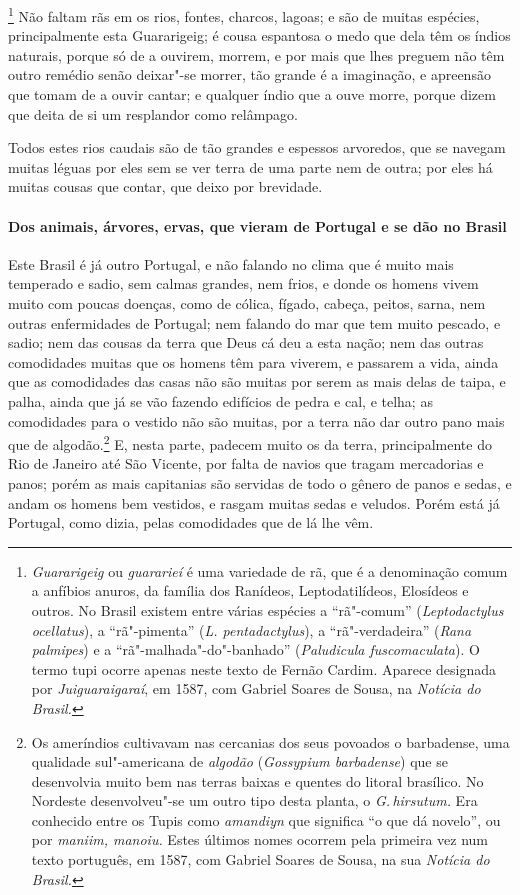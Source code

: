 \begin{linenumbers}
\footnote{ \textit{Guararigeig} ou
\textit{guararieí} é uma variedade de rã, que é a denominação comum a
anfíbios anuros, da família dos Ranídeos, Leptodatilídeos, Elosídeos e
outros. No Brasil existem entre várias espécies a ``rã"-comum''
(\textit{Leptodactylus ocellatus}), a ``rã"-pimenta'' (\textit{L. pentadactylus}), 
a ``rã"-verdadeira'' (\textit{Rana palmipes}) e a
``rã"-malhada"-do"-banhado'' (\textit{Paludicula fuscomaculata}). O termo
tupi ocorre apenas neste texto de Fernão Cardim. Aparece designada por
\textit{Juiguaraigaraí}, em 1587, com Gabriel Soares de Sousa, na
\textit{Notícia do Brasil.}} Não faltam rãs em os rios,
fontes, charcos, lagoas; e são de muitas espécies, principalmente esta
Guararigeig; é cousa espantosa o medo que dela têm os índios
naturais, porque só de a ouvirem, morrem, e por mais que lhes preguem
não têm outro remédio senão deixar"-se morrer, tão grande é a
imaginação, e apreensão que tomam de a ouvir cantar; e qualquer índio
que a ouve morre, porque dizem que deita de si um resplandor como relâmpago.

 Todos estes rios caudais são de tão grandes e espessos arvoredos, que
se navegam muitas léguas por eles sem se ver terra de uma parte nem de
outra; por eles há muitas cousas que contar, que deixo por brevidade. 


\paragraph{Dos animais, árvores, ervas, que vieram de Portugal e se dão no Brasil}\quad
 Este Brasil é já outro Portugal, e não falando no clima que é muito
mais temperado e sadio, sem calmas grandes, nem frios, e donde os
homens vivem muito com poucas doenças, como de cólica, fígado, cabeça,
peitos, sarna, nem outras enfermidades de Portugal; nem falando do mar
que tem muito pescado, e sadio; nem das cousas da terra que Deus cá deu
a esta nação; nem das outras comodidades muitas que os homens têm para
viverem, e passarem a vida, ainda que as comodidades das casas não são
muitas por serem as mais delas de taipa, e palha, ainda que já se vão
fazendo edifícios de pedra e cal, e telha; as comodidades para o
vestido não são muitas, por a terra não dar outro pano mais que de
algodão.\footnote{ Os ameríndios cultivavam nas cercanias dos seus
povoados o barbadense, uma qualidade sul"-americana de \textit{algodão}
(\textit{Gossypium barbadense}) que se desenvolvia muito bem nas terras baixas
e quentes do litoral brasílico. No Nordeste desenvolveu"-se um outro
tipo desta planta, o \textit{G.\,hirsutum.} Era conhecido entre os Tupis
como \textit{amandiyn} que significa ``o que dá novelo'', ou por
\textit{maniim, manoiu.} Estes últimos nomes ocorrem pela primeira vez
num texto português, em 1587, com Gabriel Soares de Sousa, na sua
\textit{Notícia do Brasil.}} E, nesta parte, padecem muito os da terra,
principalmente do Rio de Janeiro até São Vicente, por falta de navios
que tragam mercadorias e panos; porém as mais capitanias são servidas
de todo o gênero de panos e sedas, e andam os homens bem vestidos, e
rasgam muitas sedas e veludos. Porém está já Portugal, como dizia,
pelas comodidades que de lá lhe vêm.


\end{linenumbers}

